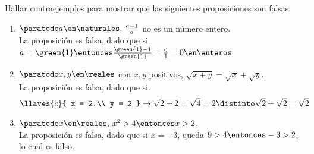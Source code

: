 \ejercicio
Hallar contraejemplos para mostrar que las siguientes proposiciones son falsas:

\separadorCorto

\begin{enumerate}[label=\roman*)]
	\item $\paratodo a \en \naturales,\, \frac{a-1}{a}$ no es un número entero.\\
            La proposición es falsa, dado que si 
                $a = \green{1}
                \entonces
                \frac{\green{1} - 1}{\green{1}} =
                \frac{0}{1} =
                0 \en \enteros$

	\item $\paratodo x, y \en \reales$ con $x, y$ positivos, $\sqrt{x+y} = \sqrt{x} + \sqrt{y}$.\\
	      La proposición es falsa, dado que si.\\
	      \[
		      \llaves{c}{
			      x = 2.\\
			      y = 2
          } \to \sqrt{2 + 2} = \sqrt{4} = 2 \distinto \sqrt{2} + \sqrt{2} = \sqrt{2}
	      \]

	\item $\paratodo x \en \reales,\, x^2 > 4 \entonces x > 2$.\\
	      La  proposición es falsa, dado que si $x = -3$, queda $9 > 4 \entonces -3 > 2$, lo cual es falso.
\end{enumerate}

